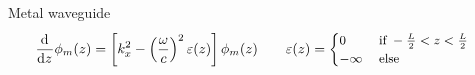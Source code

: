 \begin{frame}{Metal waveguide}
  \vspace{-2.5mm}
  \begin{equation*}
    \hspace{-0.35cm}\dv[]{}{z}\phi_m(z)=\left[k_{x}^2-\left(\frac{\omega}{c}\right)^2\varepsilon(z)\right]\phi_m(z)\qquad\varepsilon(z)={\small\begin{cases}0&\;\text{if}\;-\frac{L}{2}<z<\frac{L}{2}\\-\infty&\;\text{else}\end{cases}}
  \end{equation*}
  \vfill
  \begin{figure}
    \centering
    \resizebox{\textwidth}{!}{
      
    }
  \end{figure}
\end{frame}
